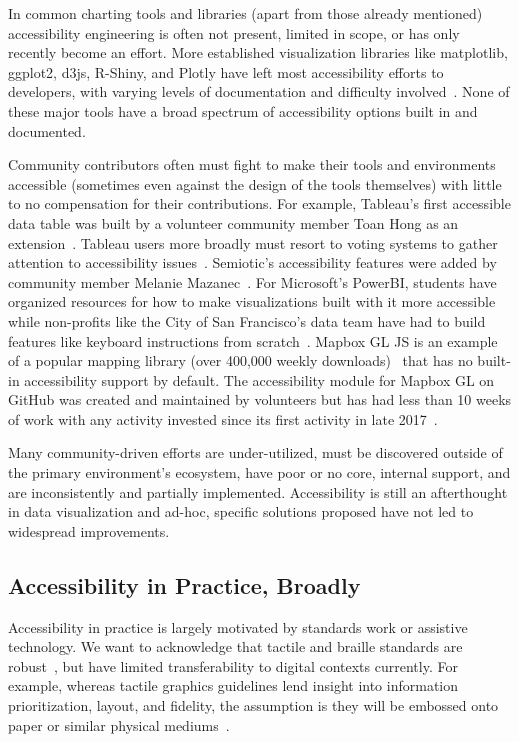 \documentclass{egpubl}
\begin{document}
In common charting tools and libraries (apart from those already mentioned) accessibility engineering is often not present, limited in scope, or has only recently become an effort. More established visualization libraries like matplotlib, ggplot2, d3js, R-Shiny, and Plotly have left most accessibility efforts to developers, with varying levels of documentation and difficulty involved~\cite{noauthor_are_2018, noauthor_making_2018, noauthor_revealing_nodate, noauthor_solved_2019, simon_making_2020}. None of these major tools have a broad spectrum of accessibility options built in and documented.

Community contributors often must fight to make their tools and environments accessible (sometimes even against the design of the tools themselves) with little to no compensation for their contributions. For example, Tableau’s first accessible data table was built by a volunteer community member Toan Hong as an extension~\cite{hoang_tableaumagic_2018}. Tableau users more broadly must resort to voting systems to gather attention to accessibility issues~\cite{demartini_tableau_nodate-1}. Semiotic’s accessibility features were added by community member Melanie Mazanec~\cite{noauthor_semiotic_nodate}. For Microsoft’s PowerBI, students have organized resources for how to make visualizations built with it more accessible~\cite{noauthor_power_nodate} while non-profits like the City of San Francisco’s data team have had to build features like keyboard instructions from scratch~\cite{noauthor_covid-19_nodate}. Mapbox GL JS is an example of a popular mapping library (over 400,000 weekly downloads)~\cite{noauthor_mapbox-gl_nodate} that has no built-in accessibility support by default. The accessibility module for Mapbox GL on GitHub was created and maintained by volunteers but has had less than 10 weeks of work with any activity invested since its first activity in late 2017~\cite{noauthor_mapboxmapbox-gl-accessibility_2021}. 

Many community-driven efforts are under-utilized, must be discovered outside of the primary environment’s ecosystem, have poor or no core, internal support, and are inconsistently and partially implemented. Accessibility is still an afterthought in data visualization and ad-hoc, specific solutions proposed have not led to widespread improvements.

\subsection{Accessibility in Practice, Broadly}
Accessibility in practice is largely motivated by standards work or assistive technology. We want to acknowledge that tactile and braille standards are robust~\cite{noauthor_guidelines_nodate}, but have limited transferability to digital contexts currently. For example, whereas tactile graphics guidelines lend insight into information prioritization, layout, and fidelity, the assumption is they will be embossed onto paper or similar physical mediums~\cite{bigham_vizwiz_2010,lundgard_sociotechnical_2019,sharif_understanding_2021}.
\end{document}
